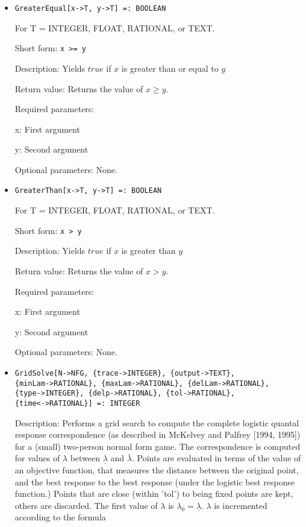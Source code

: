 \begin{itemize}
\item
\protect \large \begin{verbatim}
GreaterEqual[x->T, y->T] =: BOOLEAN
\end{verbatim}\normalsize

For T = INTEGER, FLOAT, RATIONAL, or TEXT.

\bd
\item
[Short form:] \verb+x >= y+
\item
[Description:] Yields $true$ if $x$ is greater than or equal to $y$
\item
[Return value:] Returns the value of $x \geq y$.
\item
[Required parameters:]\hfil\null

\bd
\item
[x:] First argument
\item
[y:] Second argument
\ed

\item
[Optional parameters:] None.
\ed

\item
\protect \large \begin{verbatim}
GreaterThan[x->T, y->T] =: BOOLEAN
\end{verbatim}\normalsize

For T = INTEGER, FLOAT, RATIONAL, or TEXT.

\bd
\item
[Short form:] \verb+x > y+
\item
[Description:] Yields $true$ if $x$ is greater than $y$
\item
[Return value:] Returns the value of $x > y$.
\item
[Required parameters:]\hfil\null

\bd
\item
[x:] First argument
\item
[y:] Second argument
\ed
\item
[Optional parameters:] None.
\ed

\item
\protect \large \begin{verbatim}
GridSolve[N->NFG, {trace->INTEGER}, {output->TEXT},
{minLam->RATIONAL}, {maxLam->RATIONAL}, {delLam->RATIONAL},
{type->INTEGER}, {delp->RATIONAL}, {tol->RATIONAL},
{time<->RATIONAL}] =: INTEGER
\end{verbatim}\normalsize

\bd
\item
[Description:] Performs a grid search to compute the complete logistic
quantal response correspondence (as described in McKelvey and Palfrey
[1994, 1995]) for a (small) two-person normal form game.  The
correspondence is computed for values of $\lambda$ between
$\underline{\lambda}$ and $\bar{\lambda}.$ Points are evaluated in
terms of the value of an objective function, that measures the
distance between the original point, and the best response to the best
response (under the logistic best response function.)  Points that are
close (within 'tol') to being fixed points are kept, others are
discarded.  The first value of $\lambda$ is $\lambda_0 =
\underline\lambda.$ $\lambda$ is incremented according to the formula


\end{itemize}
